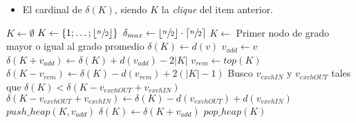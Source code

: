 \begin{pseudocodigo}
\begin{itemize}
            \item El cardinal de $\delta(K)$, siendo $K$ la \emph{clique} del item anterior.
        \end{itemize}
    \Statex
    \State $K \gets \emptyset$ 
     
        \State $K \gets \left\{1;\dots;\left\lfloor\sfrac{n}{2}\right\rfloor\right\}$ 
        \State $\delta_{max} \gets \left\lfloor\sfrac{n}{2}\right\rfloor\cdot
            \left\lceil\sfrac{n}{2}\right\rceil$ 
        \Statex
    \Else
        \State $K \gets$ Primer nodo de grado mayor o igual al grado promedio 
        \State $\delta(K) \gets d(v)$ 
         
            \State $v_{add} \gets v$ 
            \State $\delta(K+v_{add}) \gets \delta(K) + d(v_{add}) - 2|K|$ 
        \EndIf {}
        \Statex
        \State $v_{rem} \gets top(K)$ 
        \State $\delta(K-v_{rem}) \gets \delta(K)-d(v_{rem})+2(|K|-1)$ 
        \Statex
        \State Busco $v_{exchIN}$ y $v_{exchOUT}$ tales que $\delta(K) < \delta(K-v_{exchOUT}+v_{exchIN})$ 
        \State $\delta(K-v_{exchOUT}+v_{exchIN}) \gets \delta(K) - d(v_{exchOUT}) + d(v_{exchIN})$ 
        \Statex
         
            \Statex
             
                \State $push\_heap(K,v_{add})$ 
                \State $\delta(K) \gets \delta(K+v_{add})$ 
                \Statex
             
                \State $pop\_heap(K)$ 

\end{pseudocodigo}
